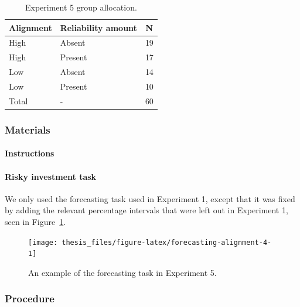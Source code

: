 \documentclass[a4paper, nobind, dvipsnames]{templates/ociamthesis}
\theoremstyle{definition}
\theoremstyle{definition}
\theoremstyle{definition}
\theoremstyle{definition}
\theoremstyle{remark}
\begin{document}
\begin{table}[tbp]

\begin{center}
\begin{threeparttable}

\caption{\label{tab:condition-allocation-alignment-4}Experiment 5 group allocation.}

\begin{tabular}{lll}
\toprule
Alignment & \multicolumn{1}{c}{Reliability amount} & \multicolumn{1}{c}{N}\\
\midrule
High & Absent & 19\\
High & Present & 17\\
Low & Absent & 14\\
Low & Present & 10\\
Total & - & 60\\
\bottomrule
\end{tabular}

\end{threeparttable}
\end{center}

\end{table}

\subsubsection{Materials}

\paragraph{Instructions}

\paragraph{Risky investment task}

We only used the forecasting task used in Experiment 1, except that it was fixed
by adding the relevant percentage intervals that were left out in Experiment 1,
seen in Figure~\ref{fig:forecasting-alignment-4}.



\begin{figure}
\texttt{[image: thesis\_files/figure-latex/forecasting-alignment-4-1]} \caption{An example of the forecasting task in Experiment 5.}\label{fig:forecasting-alignment-4}
\end{figure}

\subsubsection{Procedure}
\end{document}
